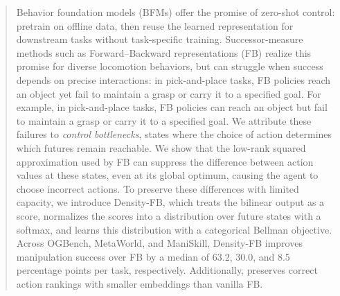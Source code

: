 

\begin{abstract} 
Behavior foundation models (BFMs) offer the promise of zero-shot control: pretrain on offline data, then reuse the learned representation for downstream tasks without task-specific training. 
Successor-measure methods such as Forward–Backward representations (FB) realize this promise for diverse locomotion behaviors, but can struggle when success depends on precise interactions: in pick-and-place tasks, FB policies reach an object yet fail to maintain a grasp or carry it to a specified goal.
For example, in pick-and-place tasks, FB policies can reach an object but fail to maintain a grasp or carry it to a specified goal. 
We attribute these failures to \emph{control bottlenecks}, states where the choice of action determines which futures remain reachable.
We show that the low-rank squared approximation used by FB can suppress the difference between action values at these states, even at its global optimum, causing the agent to choose incorrect actions.
To preserve these differences with limited capacity, we introduce Density-FB, which treats the bilinear output as a score, normalizes the scores into a distribution over future states with a softmax, and learns this distribution with a categorical Bellman objective.
Across OGBench, MetaWorld, and ManiSkill, Density-FB improves manipulation success over FB by a median of $63.2$, $30.0$, and $8.5$ percentage points per task, respectively. 
Additionally, \name{} preserves correct action rankings with smaller embeddings than vanilla FB. 
\end{abstract}